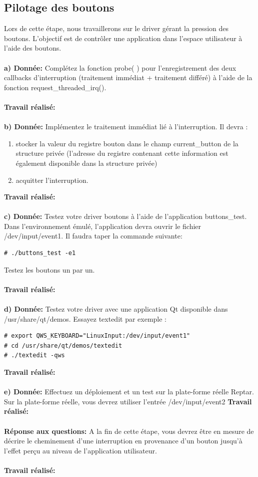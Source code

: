 \color{red}\subsection{Pilotage des boutons}
Lors de cette étape, nous travaillerons sur le driver gérant la pression des boutons. L'objectif est de
contrôler une application dans l'espace utilisateur à l'aide des boutons.\\\\
\textbf{a) Donnée: }Complétez la fonction probe( ) pour l'enregistrement des deux callbacks d'interruption (traitement
immédiat + traitement différé) à l'aide de la fonction request\_threaded\_irq().\\\\
\textbf{Travail réalisé: }\\\\
\textbf{b) Donnée: }Implémentez le traitement immédiat lié à l'interruption. Il devra :
\begin{enumerate}
	\item stocker la valeur du registre bouton dans le champ current\_button de la structure privée
	(l'adresse du registre contenant cette information est également disponible dans la structure
	privée)
	\item acquitter l'interruption.\\
\end{enumerate}
\textbf{Travail réalisé: }\\\\
\textbf{c) Donnée: }Testez votre driver boutons à l'aide de l'application buttons\_test. Dans l'environnement émulé,
l'application devra ouvrir le fichier /dev/input/event1. Il faudra taper la commande suivante:
\begin{lstlisting}
# ./buttons_test -e1
\end{lstlisting}
Testez les boutons un par un.\\\\
\textbf{Travail réalisé: }\\\\
\textbf{d) Donnée: }Testez votre driver avec une application Qt disponible dans /usr/share/qt/demos. Essayez textedit
par exemple : 
\begin{lstlisting}
# export QWS_KEYBOARD="LinuxInput:/dev/input/event1"
# cd /usr/share/qt/demos/textedit
# ./textedit -qws 
\end{lstlisting}
\textbf{Travail réalisé: }\\\\
\textbf{e) Donnée: }Effectuez un déploiement et un test sur la plate-forme réelle Reptar. Sur la plate-forme réelle, vous
devrez utiliser l'entrée /dev/input/event2
\textbf{Travail réalisé: }\\\\
\textbf{Réponse aux questions: }A la fin de cette étape, vous devrez être en mesure de décrire le cheminement d'une interruption
en provenance d'un bouton jusqu'à l'effet perçu au niveau de l’application utilisateur. \\\\
\textbf{Travail réalisé: }\\\\\color{black}